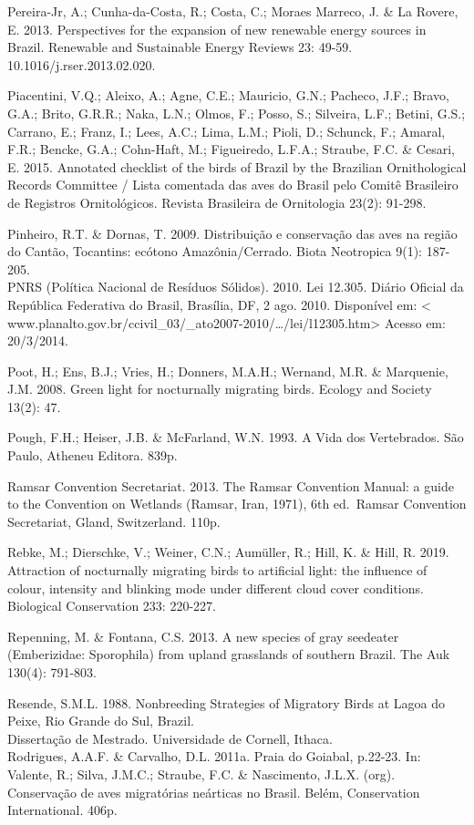 \documentclass[
  oneside]{scrbook}
\begin{document}
Pereira-Jr, A.; Cunha-da-Costa, R.; Costa, C.; Moraes Marreco, J. \& La Rovere, E. 2013. Perspectives for the expansion of new renewable energy sources in Brazil. Renewable and Sustainable Energy Reviews 23: 49-59. 10.1016/j.rser.2013.02.020.

Piacentini, V.Q.; Aleixo, A.; Agne, C.E.; Mauricio, G.N.; Pacheco, J.F.; Bravo, G.A.; Brito, G.R.R.; Naka, L.N.; Olmos, F.; Posso, S.; Silveira, L.F.; Betini, G.S.; Carrano, E.; Franz, I.; Lees, A.C.; Lima, L.M.; Pioli, D.; Schunck, F.; Amaral, F.R.; Bencke, G.A.; Cohn-Haft, M.; Figueiredo, L.F.A.; Straube, F.C. \& Cesari, E. 2015. Annotated checklist of the birds of Brazil by the Brazilian Ornithological Records Committee / Lista comentada das aves do Brasil pelo Comitê Brasileiro de Registros Ornitológicos. Revista Brasileira de Ornitologia 23(2): 91-298.

Pinheiro, R.T. \& Dornas, T. 2009. Distribuição e conservação das aves na região do Cantão, Tocantins: ecótono Amazônia/Cerrado. Biota Neotropica 9(1): 187-205.\\
PNRS (Política Nacional de Resíduos Sólidos). 2010. Lei 12.305. Diário Oficial da República Federativa do Brasil, Brasília, DF, 2 ago. 2010. Disponível em: \textless{} www.planalto.gov.br/ccivil\_03/\_ato2007-2010/\ldots/lei/l12305.htm\textgreater{} Acesso em: 20/3/2014.

Poot, H.; Ens, B.J.; Vries, H.; Donners, M.A.H.; Wernand, M.R. \& Marquenie, J.M. 2008. Green light for nocturnally migrating birds. Ecology and Society 13(2): 47.

Pough, F.H.; Heiser, J.B. \& McFarland, W.N. 1993. A Vida dos Vertebrados. São Paulo, Atheneu Editora. 839p.

Ramsar Convention Secretariat. 2013. The Ramsar Convention Manual: a guide to the Convention on Wetlands (Ramsar, Iran, 1971), 6th ed.~Ramsar Convention Secretariat, Gland, Switzerland. 110p.

Rebke, M.; Dierschke, V.; Weiner, C.N.; Aumüller, R.; Hill, K. \& Hill, R. 2019. Attraction of nocturnally migrating birds to artificial light: the influence of colour, intensity and blinking mode under different cloud cover conditions. Biological Conservation 233: 220-227.

Repenning, M. \& Fontana, C.S. 2013. A new species of gray seedeater (Emberizidae: Sporophila) from upland grasslands of southern Brazil. The Auk 130(4): 791-803.

Resende, S.M.L. 1988. Nonbreeding Strategies of Migratory Birds at Lagoa do Peixe, Rio Grande do Sul, Brazil.\\
Dissertação de Mestrado. Universidade de Cornell, Ithaca.\\
Rodrigues, A.A.F. \& Carvalho, D.L. 2011a. Praia do Goiabal, p.22-23. In: Valente, R.; Silva, J.M.C.; Straube, F.C. \& Nascimento, J.L.X. (org). Conservação de aves migratórias neárticas no Brasil. Belém, Conservation International. 406p.
\end{document}
